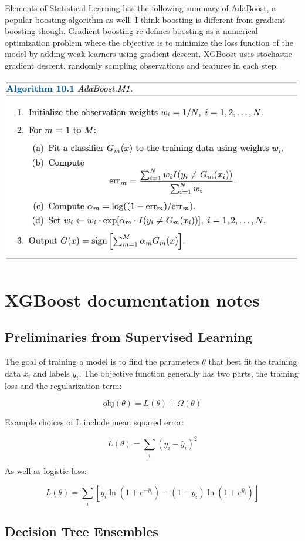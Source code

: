 \documentclass[12 pt, leqno]{article}
\begin{document}
Elements of Statistical Learning has the following summary of AdaBoost, a popular boosting algorithm as well. I think boosting is different from gradient boosting though. Gradient boosting re-defines boosting as a numerical optimization problem where the objective is to minimize the loss function of the model by adding weak learners using gradient descent. XGBoost uses stochastic gradient descent, randomly sampling observations and features in each step. 

\includegraphics[scale=0.5]{boosting_esl}

\section{XGBoost documentation notes}
\subsection{Preliminaries from Supervised Learning}

The goal of training a model is to find the parameters $\theta$ that best fit the training data $x_i$ and labels $y_i$. The objective function generally has two parts, the training loss and the regularization term:

$$ \text{obj}({\theta}) = L(\theta) + \Omega(\theta) $$

Example choices of L include mean squared error:

$$L(\theta) = \sum_i (y_i - \hat{y}_i)^2$$

As well as logistic loss:

$$L(\theta) = \sum_i [ y_i \ln (1 + e^{-\hat{y}_i}) + (1 - y_i) \ln (1 + e^{\hat{y}_i}) ] $$

\subsection{Decision Tree Ensembles}
\end{document}
